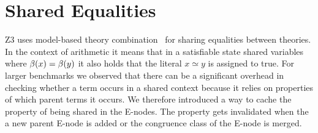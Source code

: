 \section{Shared Equalities}
Z3 uses model-based theory combination~\cite{MouraB08} for sharing equalities between theories. 
In the context of arithmetic it means that in a satisfiable state 
shared variables where $\beta(x) = \beta(y)$ it also holds that the literal $x \simeq y$ is assigned to true.
For larger benchmarks we observed that there can be a significant overhead in checking whether a term occurs in a shared context
because it relies on properties of which parent terms it occurs. We therefore introduced a way to cache the property of being shared 
in the E-nodes. The property gets invalidated when the a new parent E-node is added or the congruence class of the E-node is merged.
